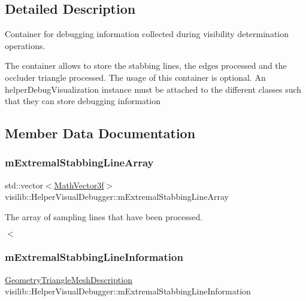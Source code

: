 \subsection{Detailed Description}
Container for debugging information collected during visibility determination operations. 

The container allows to store the stabbing lines, the edges processed and the occluder triangle processed. The usage of this container is optional. An helper\+Debug\+Visualization instance must be attached to the different classes such that they can store debugging information 

\subsection{Member Data Documentation}
\mbox{\label{classvisilib_1_1_helper_visual_debugger_ab2d63d17fe8ef31d0798c2a42551a672}} 
\subsubsection{\texorpdfstring{mExtremalStabbingLineArray}{mExtremalStabbingLineArray}}
{\footnotesize\ttfamily std\+::vector$<$\mbox{\hyperlink{classvisilib_1_1_math_vector3__}{Math\+Vector3f}}$>$ visilib\+::\+Helper\+Visual\+Debugger\+::m\+Extremal\+Stabbing\+Line\+Array\hspace{0.3cm}{\ttfamily [private]}}



The array of sampling lines that have been processed. 

$<$ \mbox{\label{classvisilib_1_1_helper_visual_debugger_a7bc0c408a8a6da48b78bb203c1f0bb27}} 
\subsubsection{\texorpdfstring{mExtremalStabbingLineInformation}{mExtremalStabbingLineInformation}}
{\footnotesize\ttfamily \mbox{\hyperlink{structvisilib_1_1_geometry_triangle_mesh_description}{Geometry\+Triangle\+Mesh\+Description}} visilib\+::\+Helper\+Visual\+Debugger\+::m\+Extremal\+Stabbing\+Line\+Information\hspace{0.3cm}{\ttfamily [private]}}



